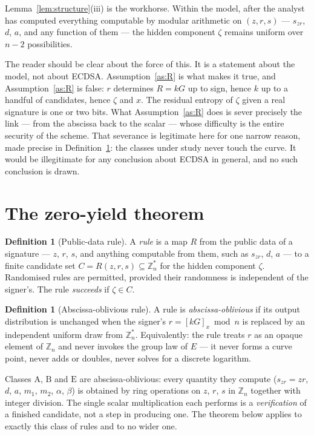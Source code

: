 \documentclass[11pt,a4paper]{article}
\theoremstyle{plain}
\theoremstyle{definition}
\newtheorem{definition}[theorem]{Definition}
\theoremstyle{remark}
\newcommand{\Zs}{\mathbb{Z}_n^{*}}
\newcommand{\szr}{s_{zr}}
\newcommand{\clA}{\mathrm{A}}
\newcommand{\clB}{\mathrm{B}}
\newcommand{\clE}{\mathrm{E}}
\begin{document}
Lemma~\ref{lem:structure}(iii) is the workhorse. Within the model, after the analyst has computed
everything computable by modular arithmetic on $(z,r,s)$ --- $\szr$, $d$, $a$, and any function of
them --- the hidden component $\zeta$ remains uniform over $n-2$ possibilities.

The reader should be clear about the force of this. It is a statement about the model, not about
ECDSA. Assumption~\ref{as:R} is what makes it true, and Assumption~\ref{as:R} is false: $r$
determines $R = kG$ up to sign, hence $k$ up to a handful of candidates, hence $\zeta$ and $x$.
The residual entropy of $\zeta$ given a real signature is one or two bits. What
Assumption~\ref{as:R} does is sever precisely the link --- from the abscissa back to the scalar ---
whose difficulty is the entire security of the scheme. That severance is legitimate here for one
narrow reason, made precise in Definition~\ref{def:oblivious}: the classes under study never touch
the curve. It would be illegitimate for any conclusion about ECDSA in general, and no such
conclusion is drawn.

\section{The zero-yield theorem}\label{sec:zeroyield}

\begin{definition}[Public-data rule]\label{def:rule}
A \emph{rule} is a map $R$ from the public data of a signature --- $z$, $r$, $s$, and anything
computable from them, such as $\szr$, $d$, $a$ --- to a finite candidate set
$C = R(z,r,s) \subseteq \Zs$ for the hidden component $\zeta$. Randomised rules are permitted,
provided their randomness is independent of the signer's. The rule \emph{succeeds} if
$\zeta \in C$.
\end{definition}

\begin{definition}[Abscissa-oblivious rule]\label{def:oblivious}
A rule is \emph{abscissa-oblivious} if its output distribution is unchanged when the signer's
$r = [kG]_x \bmod n$ is replaced by an independent uniform draw from $\Zs$. Equivalently: the rule
treats $r$ as an opaque element of $\mathbb{Z}_n$ and never invokes the group law of $E$ --- it
never forms a curve point, never adds or doubles, never solves for a discrete logarithm.
\end{definition}

Classes $\clA$, $\clB$ and $\clE$ are abscissa-oblivious: every quantity they compute
($\szr = zr$, $d$, $a$, $m_1$, $m_2$, $\alpha$, $\beta$) is obtained by ring operations on
$z$, $r$, $s$ in $\mathbb{Z}_n$ together with integer division. The single scalar multiplication
each performs is a \emph{verification} of a finished candidate, not a step in producing one. The
theorem below applies to exactly this class of rules and to no wider one.
\end{document}
